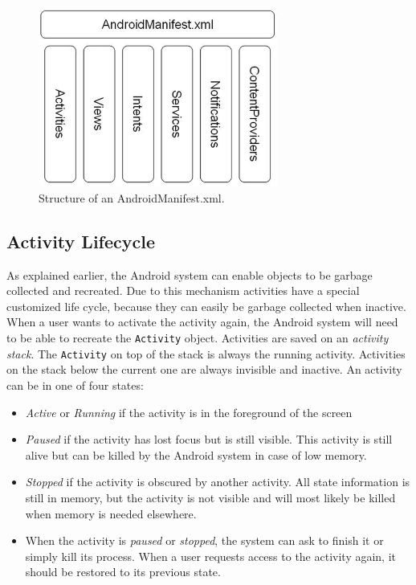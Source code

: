 \begin{figure}[h!]
\centering
\includegraphics[width=0.7\textwidth]{images/chap4_android_manifest.png}
\caption{Structure of an AndroidManifest.xml.}
\label{fig:android_manifest}
\end{figure}

\subsection{Activity Lifecycle}

As explained earlier, the Android system can enable objects to be garbage collected and recreated. Due to this mechanism activities have a special customized life cycle, because they can easily be garbage collected when inactive. When a user wants to activate the activity again, the Android system will need to be able to recreate the \texttt{Activity} object. Activities are saved on an \textit{activity stack}. The \texttt{Activity} on top of the stack is always the running activity. Activities on the stack below the current one are always invisible and inactive. An activity can be in one of four states:

\begin{itemize}
\item{\textit{Active} or \textit{Running} if the activity is in the foreground of the screen}
\item{\textit{Paused} if the activity has lost focus but is still visible. This activity is still alive but can be killed by the Android system in case of low memory.}
\item{\textit{Stopped} if the activity is obscured by another activity. All state information is still in memory, but the activity is not visible and will most likely be killed when memory is needed elsewhere.}
\item{When the activity is \textit{paused} or \textit{stopped}, the system can ask to finish it or simply kill its process. When a user requests access to the activity again, it should be restored to its previous state.}
\end{itemize}

